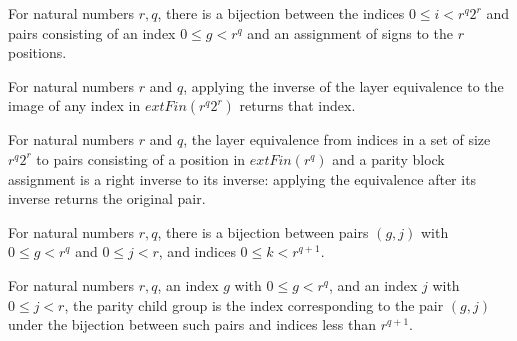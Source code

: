 \begin{definition}
\label{FABL.parityLayerEquiv}
\leanok
{}
For natural numbers $r,q$, there is a bijection between the indices $0\le i<r^q2^r$ and
pairs consisting of an index $0\le g<r^q$ and an assignment of signs to the $r$
positions.
\end{definition}

\begin{theorem}
\label{FABL.parityLayerEquiv_symm_apply_apply}
\leanok
{}
For natural numbers $r$ and $q$, applying the inverse of the layer equivalence to the
image of any index in $	ext{Fin}(r^q2^r)$ returns that index.
\end{theorem}

\begin{theorem}
\label{FABL.parityLayerEquiv_apply_symm_apply}
\leanok
{}
For natural numbers $r$ and $q$, the layer equivalence from indices in a set of size
$r^q2^r$ to pairs consisting of a position in $	ext{Fin}(r^q)$ and a parity block
assignment is a right inverse to its inverse: applying the equivalence after its inverse
returns the original pair.
\end{theorem}

\begin{definition}
\label{FABL.parityChildGroupEquiv}
\leanok
For natural numbers $r,q$, there is a bijection between pairs $(g,j)$ with $0\le g<r^q$
and $0\le j<r$, and indices $0\le k<r^{q+1}$.
\end{definition}

\begin{definition}
\label{FABL.parityChildGroup}
\leanok
{}
For natural numbers $r,q$, an index $g$ with $0\le g<r^q$, and an index $j$ with $0\le
j<r$, the parity child group is the index corresponding to the pair $(g,j)$ under the
bijection between such pairs and indices less than $r^{q+1}$.
\end{definition}

